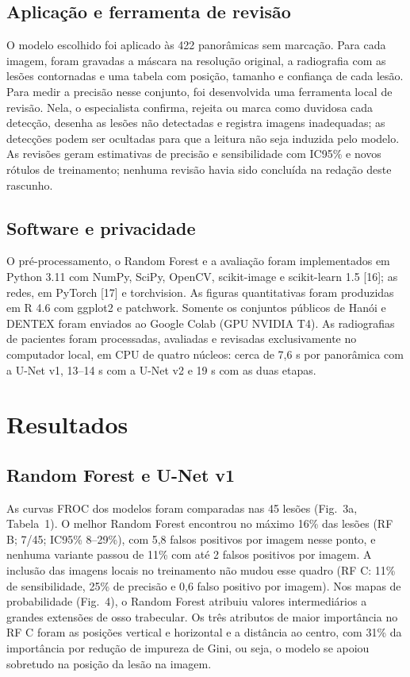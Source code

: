 \documentclass[twocolumn]{article}
\begin{document}
\subsection{Aplicação e ferramenta de revisão}

O modelo escolhido foi aplicado às 422 panorâmicas sem marcação. Para cada imagem, foram gravadas a máscara na resolução original, a radiografia com as lesões contornadas e uma tabela com posição, tamanho e confiança de cada lesão. Para medir a precisão nesse conjunto, foi desenvolvida uma ferramenta local de revisão. Nela, o especialista confirma, rejeita ou marca como duvidosa cada detecção, desenha as lesões não detectadas e registra imagens inadequadas; as detecções podem ser ocultadas para que a leitura não seja induzida pelo modelo. As revisões geram estimativas de precisão e sensibilidade com IC95\% e novos rótulos de treinamento; nenhuma revisão havia sido concluída na redação deste rascunho.

\subsection{Software e privacidade}

O pré-processamento, o Random Forest e a avaliação foram implementados em Python 3.11 com NumPy, SciPy, OpenCV, scikit-image e scikit-learn 1.5 [16]; as redes, em PyTorch [17] e torchvision. As figuras quantitativas foram produzidas em R 4.6 com ggplot2 e patchwork. Somente os conjuntos públicos de Hanói e DENTEX foram enviados ao Google Colab (GPU NVIDIA T4). As radiografias de pacientes foram processadas, avaliadas e revisadas exclusivamente no computador local, em CPU de quatro núcleos: cerca de 7,6 s por panorâmica com a U-Net v1, 13--14 s com a U-Net v2 e 19 s com as duas etapas.

\section{Resultados}

\subsection{Random Forest e U-Net v1}

As curvas FROC dos modelos foram comparadas nas 45 lesões (Fig.~3a, Tabela~1). O melhor Random Forest encontrou no máximo 16\% das lesões (RF B; 7/45; IC95\% 8--29\%), com 5,8 falsos positivos por imagem nesse ponto, e nenhuma variante passou de 11\% com até 2 falsos positivos por imagem. A inclusão das imagens locais no treinamento não mudou esse quadro (RF C: 11\% de sensibilidade, 25\% de precisão e 0,6 falso positivo por imagem). Nos mapas de probabilidade (Fig.~4), o Random Forest atribuiu valores intermediários a grandes extensões de osso trabecular. Os três atributos de maior importância no RF C foram as posições vertical e horizontal e a distância ao centro, com 31\% da importância por redução de impureza de Gini, ou seja, o modelo se apoiou sobretudo na posição da lesão na imagem.
\end{document}
